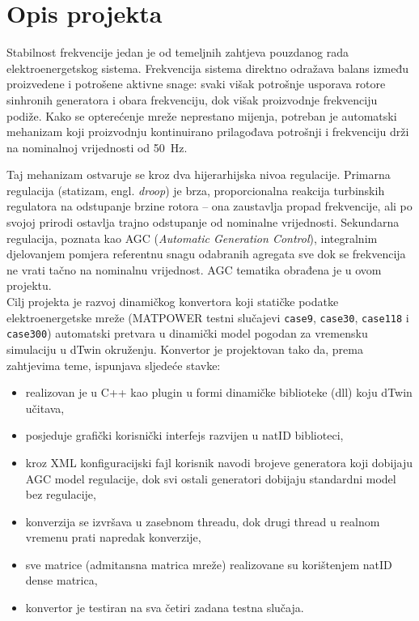 \documentclass[12pt,oneside, a4paper]{book}
\begin{document}
\section{Opis projekta}
 
Stabilnost frekvencije jedan je od temeljnih zahtjeva pouzdanog rada
elektroenergetskog sistema. Frekvencija sistema direktno odražava balans
između proizvedene i potrošene aktivne snage: svaki višak potrošnje usporava
rotore sinhronih generatora i obara frekvenciju, dok višak proizvodnje
frekvenciju podiže. Kako se opterećenje mreže neprestano mijenja, potreban je
automatski mehanizam koji proizvodnju kontinuirano prilagođava potrošnji i
frekvenciju drži na nominalnoj vrijednosti od 50~Hz.
 
Taj mehanizam ostvaruje se kroz dva hijerarhijska nivoa regulacije. Primarna
regulacija (statizam, engl. \emph{droop}) je brza, proporcionalna reakcija
turbinskih regulatora na odstupanje brzine rotora -- ona zaustavlja propad
frekvencije, ali po svojoj prirodi ostavlja trajno odstupanje od nominalne
vrijednosti. Sekundarna regulacija, poznata kao AGC (\emph{Automatic
Generation Control}), integralnim djelovanjem pomjera referentnu snagu
odabranih agregata sve dok se frekvencija ne vrati tačno na nominalnu
vrijednost. AGC tematika obrađena je u ovom projektu.\\
 \newline
Cilj projekta je razvoj dinamičkog konvertora koji statičke podatke
elektroenergetske mreže (MATPOWER testni slučajevi \texttt{case9},
\texttt{case30}, \texttt{case118} i \texttt{case300}) automatski pretvara u
dinamički model pogodan za vremensku simulaciju u dTwin okruženju. Konvertor je projektovan tako da, prema zahtjevima teme, ispunjava sljedeće stavke:
\begin{itemize}
  \item realizovan je u C++ kao plugin u formi dinamičke biblioteke (dll) koju dTwin učitava,
  \item posjeduje grafički korisnički interfejs razvijen u natID biblioteci,
  \item kroz XML konfiguracijski fajl korisnik navodi brojeve generatora koji dobijaju AGC model regulacije, dok svi ostali generatori dobijaju standardni model bez regulacije,
  \item konverzija se izvršava u zasebnom threadu, dok drugi thread u realnom vremenu prati napredak konverzije,
  \item sve matrice (admitansna matrica mreže) realizovane su korištenjem natID dense matrica,
  \item konvertor je testiran na sva četiri zadana testna slučaja.
\end{itemize}
 
\end{document}
